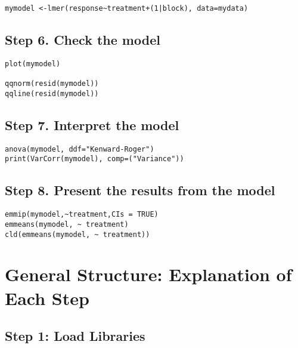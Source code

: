 \documentclass[]{book}
\theoremstyle{definition}
\theoremstyle{definition}
\theoremstyle{definition}
\theoremstyle{remark}
\begin{document}
\begin{verbatim}
mymodel <-lmer(response~treatment+(1|block), data=mydata)
\end{verbatim}

\subsection{Step 6. Check the model}\label{step-6.-check-the-model}

\begin{verbatim}
plot(mymodel)

qqnorm(resid(mymodel))
qqline(resid(mymodel))
\end{verbatim}

\subsection{Step 7. Interpret the
model}\label{step-7.-interpret-the-model}

\begin{verbatim}
anova(mymodel, ddf="Kenward-Roger")
print(VarCorr(mymodel), comp=("Variance"))
\end{verbatim}

\subsection{Step 8. Present the results from the
model}\label{step-8.-present-the-results-from-the-model}

\begin{verbatim}
emmip(mymodel,~treatment,CIs = TRUE)
emmeans(mymodel, ~ treatment)
cld(emmeans(mymodel, ~ treatment))
\end{verbatim}

\section{General Structure: Explanation of Each
Step}\label{general-structure-explanation-of-each-step}

\subsection{Step 1: Load Libraries}\label{step-1-load-libraries-1}
\end{document}
